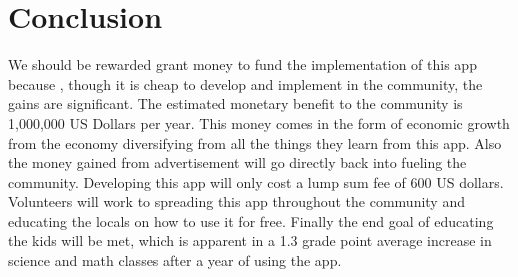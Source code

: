 \documentclass[a4paper, 11pt]{article}
\begin{document}
\section*{Conclusion}
We should be rewarded grant money to fund the implementation of this app because , though it is cheap to develop and implement in the community, the gains are significant. The estimated monetary benefit to the community is 1,000,000 US Dollars per year. This money comes in the form of economic growth from the economy diversifying from all the things they learn from this app. Also the money gained from advertisement will go directly back into fueling the community. Developing this app will only cost a lump sum fee of 600 US dollars. Volunteers will work to spreading this app throughout the community and educating the locals on how to use it for free. Finally the end goal of educating the kids will be met, which is apparent in a 1.3 grade point average increase in science and math classes after a year of using the app.
\end{document}
